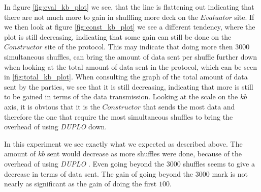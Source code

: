 \documentclass[twoside,11pt,openright]{report}
\newcommand{\DUPLO}{\textit{DUPLO} }
\begin{document}
In figure \ref{fig:eval_kb_plot} we see, that the line is flattening out indicating that there are not much more to gain in shuffling more deck on the $Evaluator$ site. If we then look at figure \ref{fig:const_kb_plot} we see a different tendency, where the plot is still decreasing, indicating that some gain can still be done on the $Constructor$ site of the protocol. This may indicate that doing more then $3000$ simultaneous shuffles, can bring the amount of data sent per shuffle further down when looking at the total amount of data sent in the protocol, which can be seen in \ref{fig:total_kb_plot}. When consulting the graph of the total amount of data sent by the parties, we see that it is still decreasing, indicating that more is still to be gained in terms of the data transmission. Looking at the scale on the $kb$ axis, it is obvious that it is the $Constructor$ that sends the most data and therefore the one that require the most simultaneous shuffles to bring the overhead of using \DUPLO down.

\bigskip

In this experiment we see exactly what we expected as described above. The amount of $kb$ sent would decrease as more shuffles were done, because of the overhead of using \DUPLO. Even going beyond the $3000$ shuffles seems to give a decrease in terms of data sent. The gain of going beyond the $3000$ mark is not nearly as significant as the gain of doing the first $100$.

\bigskip
\end{document}
